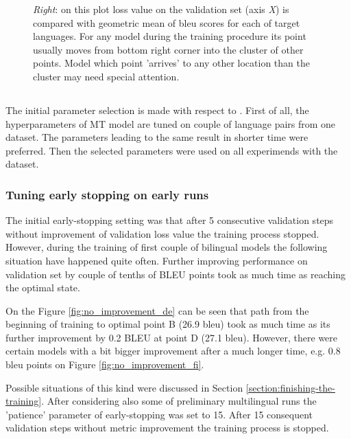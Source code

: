 \begin{figure}[h]
{		\emph{Right}: on this plot loss value on the validation set (axis \emph{X})
		is compared with geometric mean of \acrshort{bleu} scores
		for each of target languages.
		For any model during the training procedure its point usually moves from
		bottom right corner into the cluster of other points.
		Model which point 'arrives' to any other location than the cluster may need
		special attention.
	}
	\label{fig:inspect-convergence}
\end{figure}



\subsection{}

The initial parameter selection is made with respect to \cite{training-tips}.
First of all, the hyperparameters of MT model are tuned
on couple of language pairs from one dataset.
The parameters leading to the same result in shorter time were preferred.
Then the selected parameters were used on all experimends with the dataset.


\subsubsection*{Tuning early stopping on early runs}

The initial \gls{early-stopping} setting was that after 5 consecutive
validation steps without improvement of validation \gls{loss} value
the training process stopped.
However, during the training of first couple of bilingual models the following
situation have happened quite often.
Further improving performance on validation set by
couple of tenths of BLEU points took as much time as reaching the optimal state.

On the Figure \ref{fig:no_improvement_de} can be seen that path from
the beginning of training to optimal point B (26.9 \acrshort{bleu})
took as much time as its further improvement by 0.2 BLEU
at point D (27.1 \acrshort{bleu}). However, there were certain models
with a bit bigger improvement after a much longer time, e.g.
0.8 \acrshort{bleu} points on Figure \ref{fig:no_improvement_fi}.

Possible situations of this kind were discussed in
Section \ref{section:finishing-the-training}.
After considering also some of preliminary multilingual runs
the 'patience' parameter of \gls{early-stopping} was set to 15.
After 15 consequent validation steps without metric improvement
the training process is stopped.

